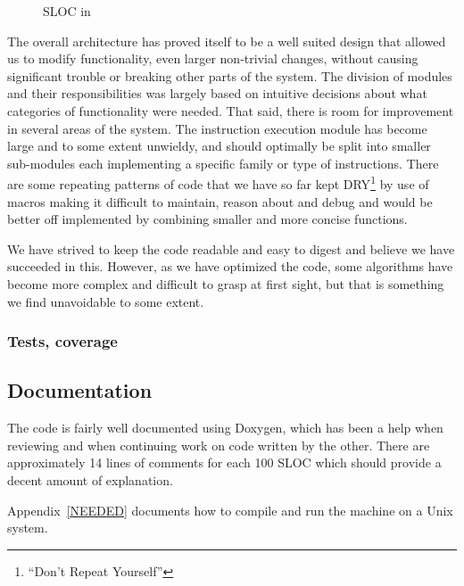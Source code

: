 \begin{figure}
  \centering
  
  \caption{SLOC in \thename{}}
\label{fig:eval:sloc}
\end{figure}

The overall architecture has proved itself to be a well suited design that
allowed us to modify functionality, even larger non-trivial changes, without
causing significant trouble or breaking other parts of the system. The division
of modules and their responsibilities was largely based on intuitive decisions
about what categories of functionality were needed. That said, there is room for
improvement in several areas of the system. The instruction execution module has
become large and to some extent unwieldy, and should optimally be split into
smaller sub-modules each implementing a specific family or type of
instructions. There are some repeating patterns of code that we have so far kept
DRY\footnote{``Don't Repeat Yourself''} by use of macros making it difficult to
maintain, reason about and debug and would be better off implemented by
combining smaller and more concise functions.

We have strived to keep the code readable and easy to digest and believe we have
succeeded in this. However, as we have optimized the code, some algorithms have
become more complex and difficult to grasp at first sight, but that is something
we find unavoidable to some extent.

\subsubsection{Tests, coverage}



\subsection{Documentation}

The code is fairly well documented using Doxygen, which has been a help when
reviewing and when continuing work on code written by the other. There are
approximately 14 lines of comments for each 100 SLOC which should provide a
decent amount of explanation.

Appendix~\ref{NEEDED} documents how to compile and run the machine on a Unix
system.


